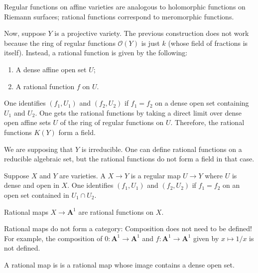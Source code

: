 \documentclass [11 pt, oneside, margin = 1 in] {article}
\begin{document}
\begin{remark}
	Regular functions on affine varieties are analogous to holomorphic functions on Riemann surfaces; rational functions correspond to meromorphic functions.
\end{remark}

Now, suppose $Y$ is a projective variety. The previous construction does not work because the ring of regular functions $\mathscr{O}(Y)$ is just $k$ (whose field of fractions is itself). Instead, a rational function is given by the following:
 \begin{enumerate}
	\item A dense affine open set $U$;
	\item A rational function $f$ on $U$.
\end{enumerate}
One identifies $(f_1,U_1)$ and $(f_2,U_2)$ if $f_1=f_2$ on a dense open set containing $U_1$ and $U_2$. One gets the rational functions by taking a direct limit over dense open affine sets $U$ of the ring of regular functions on $U$. Therefore, the rational functions $K(Y)$ form a field.

\begin{remark}
	We are supposing that $Y$ is irreducible. One can define rational functions on a reducible algebraic set, but the rational functions do not form a field in that case.
\end{remark}

Suppose $X$ and $Y$ are varieties. A  $X\longrightarrow Y$ is a regular map $U\longrightarrow Y$ where $U$ is dense and open in $X$. One identifies $(f_1,U_1)$ and $(f_2,U_2)$ if $f_1=f_2$ on an open set contained in $U_1\cap U_2$.

\begin{example}[ ]\label{}\text{}
Rational maps $X\longrightarrow \mathbf{A}^1$ are rational functions on $X$.
\end{example}

Rational maps do not form a category: Composition does not need to be defined! For example, the composition of $0:\mathbf{A}^1\longrightarrow \mathbf{A}^1$ and $f:\mathbf{A}^1\longrightarrow \mathbf{A}^1$ given by $x\longmapsto 1/x$ is not defined.

\begin{definition}[ ]\label{}\text{}
A rational map is  is a rational map whose image contains a dense open set.
\end{definition}
\end{document}
